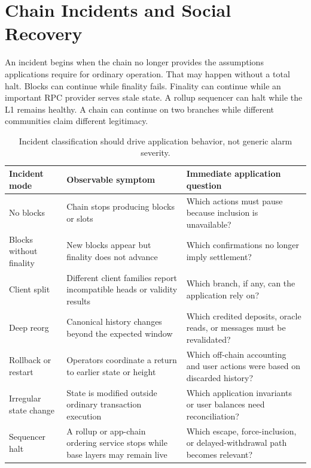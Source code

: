 \section{Chain Incidents and Social Recovery}

An incident begins when the chain no longer provides the assumptions applications require for ordinary operation. That may happen without a total halt. Blocks can continue while finality fails. Finality can continue while an important RPC provider serves stale state. A rollup sequencer can halt while the L1 remains healthy. A chain can continue on two branches while different communities claim different legitimacy.

\begin{table}[htbp]
\centering
\small
\renewcommand{\arraystretch}{1.15}
\begin{tabularx}{\textwidth}{@{}>{\RaggedRight\arraybackslash}p{}>{\RaggedRight\arraybackslash}p{}X@{}}
\toprule
Incident mode & Observable symptom & Immediate application question \\
\midrule
No blocks & Chain stops producing blocks or slots & Which actions must pause because inclusion is unavailable? \\
Blocks without finality & New blocks appear but finality does not advance & Which confirmations no longer imply settlement? \\
Client split & Different client families report incompatible heads or validity results & Which branch, if any, can the application rely on? \\
Deep reorg & Canonical history changes beyond the expected window & Which credited deposits, oracle reads, or messages must be revalidated? \\
Rollback or restart & Operators coordinate a return to earlier state or height & Which off-chain accounting and user actions were based on discarded history? \\
Irregular state change & State is modified outside ordinary transaction execution & Which application invariants or user balances need reconciliation? \\
Sequencer halt & A rollup or app-chain ordering service stops while base layers may remain live & Which escape, force-inclusion, or delayed-withdrawal path becomes relevant? \\
\bottomrule
\end{tabularx}
\caption{Incident classification should drive application behavior, not generic alarm severity.}
\end{table}

